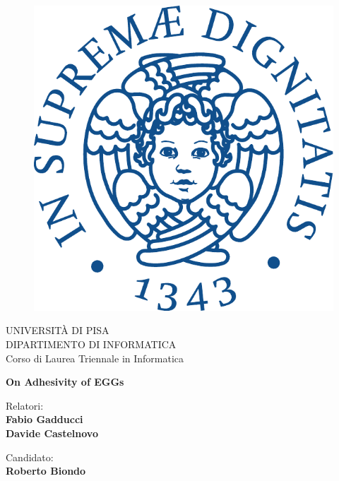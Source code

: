 \begin{titlepage}
\begin{figure}[!htb]
    \centering
    \includegraphics[keepaspectratio=true,scale=0.5]{cherubino_pant541.pdf}
\end{figure}

\begin{center}
    \LARGE{UNIVERSITÀ DI PISA}
    \vspace{5mm}
    \\ \large{DIPARTIMENTO DI INFORMATICA }
    \vspace{5mm}
    \\ \LARGE{Corso di Laurea Triennale in Informatica}
\end{center}

\vspace{15mm}
\begin{center}
	{\LARGE{\bf On Adhesivity of EGGs}}%
\end{center}
\vspace{30mm}

\begin{minipage}[t]{0.47\textwidth}
	{\large{Relatori:}{\normalsize\vspace{3mm}
	\bf\\ \large{Fabio Gadducci \vspace{2mm}\\Davide Castelnovo}}}
\end{minipage}
\hfill
\begin{minipage}[t]{0.47\textwidth}\raggedleft
	{\large{Candidato:}{\normalsize\vspace{3mm} \bf\\ \large{Roberto Biondo\\ }}}
\end{minipage}

\vspace{30mm}
\hrulefill
\\

\end{titlepage}
